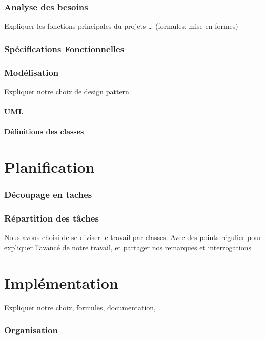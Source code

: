 \documentclass{polytech/polytech}
\begin{document}
	\section{Analyse des besoins}
	Expliquer les fonctions principales du projets … (formules, mise en formes)

	\section{Spécifications Fonctionnelles}

	\section{Modélisation}
	Expliquer notre choix de design pattern.

	\subsection{UML}

	\subsection{Définitions des classes}

	\part{Planification}

	\section{Découpage en taches}

	\section{Répartition des tâches}

	Nous avons choisi de se diviser le travail par classes.
	Avec des points régulier pour expliquer l'avancé de notre travail, et partager nos remarques et
	interrogations

	\part{Implémentation}

	Expliquer notre choix, formules, documentation, ...

	\section{Organisation}
\end{document}
